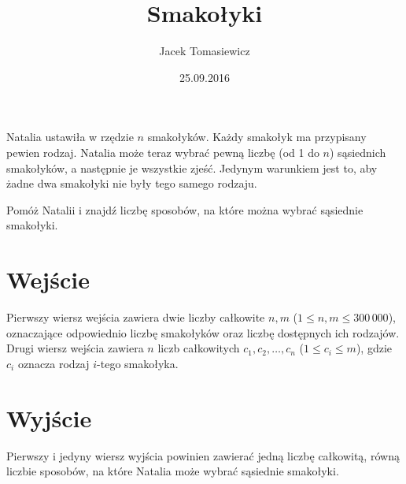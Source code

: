 \documentclass[zad,zawodnik,utf8]{sinol}
\title{Smakołyki}
\author{Jacek Tomasiewicz} %
\date{25.09.2016}
\begin{document}
\begin{tasktext}%
Natalia ustawiła w rzędzie $n$ smakołyków. Każdy smakołyk ma przypisany 
pewien rodzaj. Natalia może teraz wybrać pewną liczbę (od 1 do $n$) sąsiednich  
smakołyków, a następnie je wszystkie zjeść. Jedynym warunkiem jest to, aby żadne dwa 
smakołyki nie były tego samego rodzaju.

Pomóż Natalii i znajdź liczbę sposobów, na które można wybrać sąsiednie smakołyki. 

  \section{Wejście}
Pierwszy wiersz wejścia zawiera dwie liczby całkowite $n, m$ ($1 \leq n, m \leq 300\,000$), 
oznaczające odpowiednio liczbę smakołyków oraz liczbę dostępnych ich rodzajów. Drugi wiersz wejścia zawiera $n$ liczb całkowitych 
$c_1, c_2, \ldots, c_n$ ($1 \leq c_i \leq m$), gdzie $c_i$ oznacza rodzaj 
$i$-tego smakołyka.

  \section{Wyjście}
Pierwszy i jedyny wiersz wyjścia powinien zawierać jedną liczbę całkowitą, 
równą liczbie sposobów, na które Natalia może wybrać sąsiednie smakołyki.

\makecompactexample

\end{tasktext}
\end{document}
